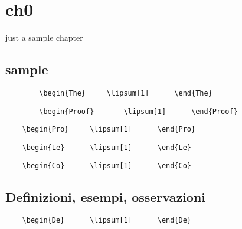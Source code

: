 \chapter{ch0}
just a sample chapter

\section{sample}
	\begin{verbatim}
		\begin{The}		\lipsum[1]		\end{The}
	\end{verbatim}
\begin{The}		\lipsum[1]		\end{The}

	\begin{verbatim}
		\begin{Proof}		\lipsum[1]		\end{Proof}
	\end{verbatim}
\begin{Proof}	\lipsum[2]		\end{Proof}

\begin{verbatim}
	\begin{Pro}		\lipsum[1]		\end{Pro}
\end{verbatim}
\begin{Pro}		\lipsum[3] 		\end{Pro}

\begin{verbatim}
	\begin{Le}		\lipsum[1]		\end{Le}
\end{verbatim}
\begin{Le}			\lipsum[5]		\end{Le}

\begin{verbatim}
	\begin{Co}		\lipsum[1]		\end{Co}
\end{verbatim}
\begin{Co}		\lipsum[6]		\end{Co}
\section{Definizioni, esempi, osservazioni}
\begin{verbatim}
	\begin{De}		\lipsum[1]		\end{De}
\end{verbatim}
\begin{De}		\lipsum[7]		\end{De}

